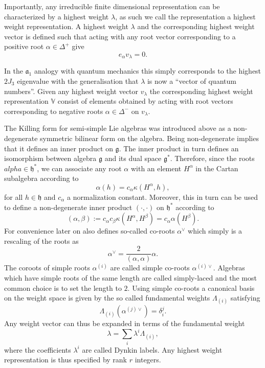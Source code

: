 Importantly, any irreducible finite dimensional representation can be characterized by a highest weight $\lambda$, as such we call the representation a highest weight representation. A highest weight $\lambda$ and the corresponding highest weight vector is defined such that acting with any root vector corresponding to a positive root $\alpha\in\Delta^+$ give
\begin{equation}
    e_\alpha v_\lambda = 0.
\end{equation}

In the $\mathfrak{a}_1$ analogy with quantum mechanics this simply corresponds to the highest $2J_3$ eigenvalue with the generalisation that $\lambda$ is now a ``vector of quantum numbers''. Given any highest weight vector $v_\lambda$ the corresponding highest weight representation $\mathbb{V}$ consist of elements obtained by acting with root vectors corresponding to negative roots $\alpha\in\Delta^-$ on $v_\lambda$.

The Killing form for semi-simple Lie algebras was introduced above as a non-degenerate symmetric bilinear form on the algebra. Being non-degenerate implies that it defines an inner product on $\mathfrak{g}$. The inner product in turn defines an isomorphism between algebra $\mathfrak{g}$ and its dual space $\mathfrak{g}^*$. Therefore, since the roots $alpha\in\mathfrak{h}^*$, we can associate any root $\alpha$ with an element $H^\alpha$ in the Cartan subalgebra according to 
\begin{equation}
    \alpha(h) = c_\alpha \kappa(H^\alpha,h),
\end{equation}
for all $h\in\mathfrak{h}$ and $c_\alpha$ a normalization constant. Moreover, this in turn can be used to define a non-degenerate inner product $(\cdot,\cdot)$ on $\mathfrak{h}^*$ according to
\begin{equation}
    (\alpha,\beta):= c_\alpha c_\beta \kappa(H^\alpha,H^\beta) = c_\alpha \alpha(H^\beta).
\end{equation}
For convenience later on also defines so-called co-roots $\alpha^\vee$ which simply is a rescaling of the roots as 
\begin{equation}
    \alpha^\vee = \frac{2}{(\alpha,\alpha)}\alpha.
\end{equation}
The coroots of simple roots $\alpha^{(i)}$ are called simple co-roots $\alpha^{(i)\vee}$. Algebras which have simple roots of the same length are called simply-laced and the most common choice is to set the length to $2$. Using simple co-roots a canonical basis on the weight space is given by the so called fundamental weights $\Lambda_{(i)}$ satisfying 
\begin{equation}
    \Lambda_{(i)}(\alpha^{(j)\vee}) = \delta^j_i.
\end{equation}
Any weight vector can thus be expanded in terms of the fundamental weight 
\begin{equation}
    \lambda = \sum_i \lambda^i\Lambda_{(i)},
\end{equation}
where the coefficients $\lambda^i$ are called Dynkin labels. Any highest weight representation is thus specified by rank $r$ integers. 

